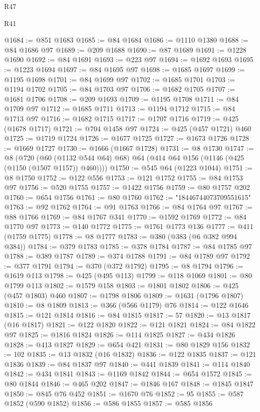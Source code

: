 \begin{lexlean}{R47}
\begin{lexlean}{R41}
\begin{coremodule}
{{{{{{{{{{{{{{{{{{{{{{{{{{{{{{{{{{{{{{{{{{{{{{{{{{{{{{{{{{{{{{{{{{{{{{{{{{{{{{{{{{{{{{{@1684 := @851 @1683
@1685 := @84 @1684
@1686 := @1110 @1380
@1688 := @84 @1686 @97
@1689 := @209 @1688
@1690 := @87 @1689
@1691 := @1228 @1690
@1692 := @84 @1691
@1693 := @223 @97
@1694 := @1692 @1693
@1695 := @1223 @1694
@1697 := @84 @1695 @97
@1698 := @1685 @1697
@1699 := @1195 @1698
@1701 := @84 @1699 @97
@1702 := @1685 @1701
@1703 := @1194 @1702
@1705 := @84 @1703 @97
@1706 := @1682 @1705
@1707 := @1681 @1706
@1708 := @209 @1693
@1709 := @1195 @1708
@1711 := @84 @1709 @97
@1712 := @1685 @1711
@1713 := @1194 @1712
@1715 := @84 @1713 @97
@1716 := @1682 @1715
@1717 := @1707 @1716
@1719 := @425 (@1678 @1717)
@1721 := @704 @1458 @97
@1724 := @425 (@457 @1721) @460
@1725 := @1719 @1724
@1726 := @1677 @1725
@1727 := @1673 @1726
@1728 := @1669 @1727
@1730 := @1666 (@1667 @1728)
@1731 := @8 @1730
@1747 := @8
    (@720 (@60 (@1132 @544 @64) @68) @64 (@414 @64 @156 (@1146 (@425 (@1150 (@1507 @1157)) @460))))
@1750 := @545 @64 (@1223 @1044)
@1751 := @8 @1750
@1752 := @122 @556
@1753 := @121 @1752
@1755 := @84 @1753 @97
@1756 := @520 @1755
@1757 := @1422 @1756
@1759 := @80 @1757 @202
@1760 := @654 @1756
@1761 := @80 @1760
@1762 := "18446744073709551615"
@1763 := @92 @1762
@1764 := @91 @1763
@1766 := @84 @1764 @97
@1767 := @88 @1766
@1769 := @84 @1767 @341
@1770 := @1592 @1769
@1772 := @84 @1770 @97
@1773 := @140 @1772
@1775 := @1761 @1773 @136
@1777 := @411 (@1759 @1775)
@1778 := @8 @1777
@1783 := @380 (@383 (@6 @382 @994 @384))
@1784 := @379 @1783
@1785 := @378 @1784
@1787 := @84 @1785 @97
@1788 := @389 @1787
@1789 := @374 @1788
@1791 := @84 @1789 @97
@1792 := @377 @1791
@1794 := @370 (@372 @1792)
@1795 := @8 @1794
@1796 := @1619 @113
@1798 := @425 (@495 @113)
@1799 := @118 @1069
@1801 := @80 @1799 @113
@1802 := @1579 @158
@1803 := @1801 @1802
@1806 := @425 (@457 @1803) @460
@1807 := @1798 @1806
@1809 := @1631 (@1796 @1807)
@1810 := @8 @1809
@1813 := @366 (@566 @1179) @76
@1814 := @122 @1646
@1815 := @121 @1814
@1816 := @84 @1815
@1817 := 57
@1820 := @13 @1817 (@16 @1817)
@1821 := @122 @1820
@1822 := @121 @1821
@1824 := @84 @1822 @97
@1825 := @1816 @1824
@1826 := @114 @1825
@1827 := @434 @1826
@1828 := @413 @1827
@1829 := @654 @421
@1831 := @80 @1829 @156
@1832 := 102
@1835 := @13 @1832 (@16 @1832)
@1836 := @122 @1835
@1837 := @121 @1836
@1839 := @84 @1837 @97
@1840 := @441 @1839
@1841 := @114 @1840
@1842 := @434 @1841
@1843 := @1169 @1842
@1844 := @654 @1572
@1845 := @80 @1844
@1846 := @465 @202
@1847 := @1846 @167
@1848 := @1845 @1847
@1850 := @845 @76 @452
@1851 := @1670 @76
@1852 := 95
@1855 := @587 @1852 (@590 @1852)
@1856 := @586 @1855
@1857 := @585 @1856
}}}}}}}}}}}}}}}}}}}}}}}}}}}}}}}}}}}}}}}}}}}}}}}}}}}}}}}}}}}}}}}}}}}}}}}}}}}}}}}}}}}}}}}
\end{coremodule}
\end{lexlean}
\end{lexlean}
